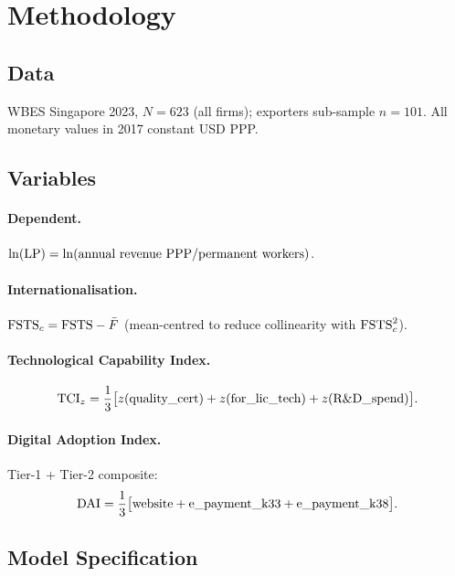 \documentclass[smallextended]{svjour3}   %
\begin{document}
\section{Methodology}
\label{sec:methods}

\subsection{Data}

WBES Singapore 2023, \(N = 623\) (all firms); exporters sub-sample
\(n = 101\).  All monetary values in 2017 constant USD PPP.

\subsection{Variables}

\paragraph{Dependent.}
\({\ln(\mathrm{LP})} = \ln(\text{annual revenue PPP} / \text{permanent workers})\).

\paragraph{Internationalisation.}
\({\mathrm{FSTS}_{c}} = {\mathrm{FSTS}} - \bar{F}\) (mean-centred to reduce collinearity with
\({\mathrm{FSTS}_{c}^{2}}\)).

\paragraph{Technological Capability Index.}
\begin{equation}
  {\mathrm{TCI}_{z}} = \frac{1}{3}\bigl[z(\text{quality\_cert}) + z(\text{for\_lic\_tech})
    + z(\text{R\&D\_spend})\bigr].
  \label{eq:tci_p4}
\end{equation}

\paragraph{Digital Adoption Index.}
Tier-1 + Tier-2 composite:
\begin{equation}
  {\mathrm{DAI}} = \frac{1}{3}\bigl[\text{website} + \text{e\_payment\_k33}
    + \text{e\_payment\_k38}\bigr].
  \label{eq:dai_p4}
\end{equation}

\subsection{Model Specification}
\end{document}
